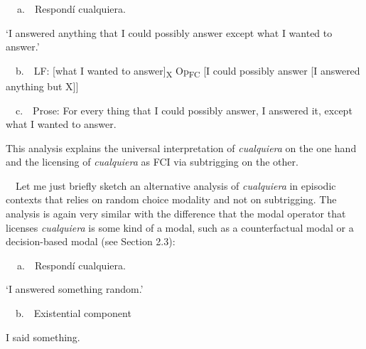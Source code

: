 \begin{styleStandard}
\label{bkm:Ref63461661}\textbf{\ \ }a.\ \ Respondí cualquiera.
\end{styleStandard}

\begin{styleStandard}
‘I answered anything that I could possibly answer except what I wanted to answer.’
\end{styleStandard}

\begin{styleStandard}
\ \ b.\ \ LF: [what I wanted to answer]\textsubscript{X} Op\textsubscript{FC} [I could possibly answer [I answered anything but X]] 
\end{styleStandard}

\begin{styleStandard}
\ \ c.\ \ Prose: For every thing that I could possibly answer, I answered it, except what I wanted to answer.
\end{styleStandard}

\begin{styleStandard}
This analysis explains the universal interpretation of \textit{cualquiera} on the one hand and the licensing of \textit{cualquiera} as FCI via subtrigging on the other.
\end{styleStandard}

\begin{styleStandard}
\ \ Let me just briefly sketch an alternative analysis of \textit{cualquiera} in episodic contexts that relies on random choice modality and not on subtrigging. The analysis is again very similar with the difference that the modal operator that licenses \textit{cualquiera} is some kind of a modal, such as a counterfactual modal or a decision-based modal (see Section 2.3):
\end{styleStandard}

\begin{styleStandard}
\label{bkm:Ref150787301}\textbf{\ \ }a.\ \ Respondí cualquiera. 
\end{styleStandard}

\begin{styleStandard}
‘I answered something random.’
\end{styleStandard}

\begin{styleStandard}
\ \ b.\ \ Existential component
\end{styleStandard}

\begin{styleStandard}
I said something.
\end{styleStandard}

